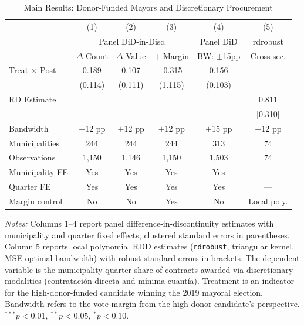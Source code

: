 \begin{table}[t]
\centering
\begin{threeparttable}
\caption{Main Results: Donor-Funded Mayors and Discretionary Procurement}
\label{tab:main}
\begin{tabular}{lccccc}
\hline\hline
 & (1) & (2) & (3) & (4) & (5) \\
 & \multicolumn{3}{c}{Panel DiD-in-Disc.} & Panel DiD & rdrobust \\
 & $\Delta$ Count & $\Delta$ Value & + Margin & BW: $\pm$15pp & Cross-sec. \\
\hline
Treat $\times$ Post & 0.189 & 0.107 & -0.315 & 0.156 & \\
 & (0.114) & (0.111) & (1.115) & (0.103) & \\
RD Estimate & & & & & 0.811 \\
 & & & & & [0.310] \\
\hline
Bandwidth & $\pm$12 pp & $\pm$12 pp & $\pm$12 pp & $\pm$15 pp & $\pm$12 pp \\
Municipalities & 244 & 244 & 244 & 313 & 74 \\
Observations & 1,150 & 1,146 & 1,150 & 1,503 & 74 \\
Municipality FE & Yes & Yes & Yes & Yes & --- \\
Quarter FE & Yes & Yes & Yes & Yes & --- \\
Margin control & No & No & Yes & No & Local poly. \\
\hline\hline
\end{tabular}
\begin{tablenotes}[flushleft]
\item \textit{Notes:} Columns 1--4 report panel difference-in-discontinuity estimates with municipality and quarter fixed effects, clustered standard errors in parentheses. Column 5 reports local polynomial RDD estimates (\texttt{rdrobust}, triangular kernel, MSE-optimal bandwidth) with robust standard errors in brackets. The dependent variable is the municipality-quarter share of contracts awarded via discretionary modalities (contrataci\'{o}n directa and m\'{i}nima cuant\'{i}a). Treatment is an indicator for the high-donor-funded candidate winning the 2019 mayoral election. Bandwidth refers to the vote margin from the high-donor candidate's perspective. $^{***}p<0.01$, $^{**}p<0.05$, $^{*}p<0.10$.
\end{tablenotes}
\end{threeparttable}
\end{table}

